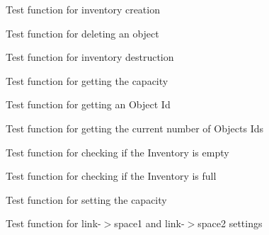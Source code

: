 \begin{DoxyRefList}
\item[\label{test__test000090}%
\hypertarget{test__test000090}{}%
Member \hyperlink{inventory__test_8h_a73a6080c360a8870c4ffc734e989c8b3}{test2\+\_\+inventory\+\_\+create} ()]Test function for inventory creation  
\item[\label{test__test000098}%
\hypertarget{test__test000098}{}%
Member \hyperlink{inventory__test_8h_a242baf98676c3685d4696ec6c006cbb9}{test2\+\_\+inventory\+\_\+del} ()]Test function for deleting an object  
\item[\label{test__test000092}%
\hypertarget{test__test000092}{}%
Member \hyperlink{inventory__test_8h_a9f3daec28c696c0671e6a3e905359741}{test2\+\_\+inventory\+\_\+destroy} ()]Test function for inventory destruction  
\item[\label{test__test000112}%
\hypertarget{test__test000112}{}%
Member \hyperlink{inventory__test_8h_ac75954611acab583f780145532ab3197}{test2\+\_\+inventory\+\_\+get\+\_\+max\+\_\+objects} ()]Test function for getting the capacity  
\item[\label{test__test000106}%
\hypertarget{test__test000106}{}%
Member \hyperlink{inventory__test_8h_a41ba2562e1c60e222110f05c9a8e221e}{test2\+\_\+inventory\+\_\+get\+\_\+object\+\_\+id} ()]Test function for getting an Object Id  
\item[\label{test__test000109}%
\hypertarget{test__test000109}{}%
Member \hyperlink{inventory__test_8h_a3546785f0cda504b4d16c89c19f0b23e}{test2\+\_\+inventory\+\_\+get\+\_\+objects\+\_\+number} ()]Test function for getting the current number of Objects Ids  
\item[\label{test__test000118}%
\hypertarget{test__test000118}{}%
Member \hyperlink{inventory__test_8h_a4d2a2a4d4ba59446d013debfe9bf05dc}{test2\+\_\+inventory\+\_\+is\+\_\+empty} ()]Test function for checking if the Inventory is empty  
\item[\label{test__test000121}%
\hypertarget{test__test000121}{}%
Member \hyperlink{inventory__test_8h_a1c9e567d4919d5aaccc9580815a8a81d}{test2\+\_\+inventory\+\_\+is\+\_\+full} ()]Test function for checking if the Inventory is full  
\item[\label{test__test000102}%
\hypertarget{test__test000102}{}%
Member \hyperlink{inventory__test_8h_aff93a7fb7ffbac1890ce563012a9d372}{test2\+\_\+inventory\+\_\+set\+\_\+max\+\_\+objects} ()]Test function for setting the capacity  
\item[\label{test__test000131}%
\hypertarget{test__test000131}{}%
Member \hyperlink{link__test_8h_a1a9f0d8d05848f9cc3f9f30097ca9452}{test2\+\_\+link\+\_\+add\+\_\+space} ()]Test function for link-\/$>$space1 and link-\/$>$space2 settings  

\end{DoxyRefList}

